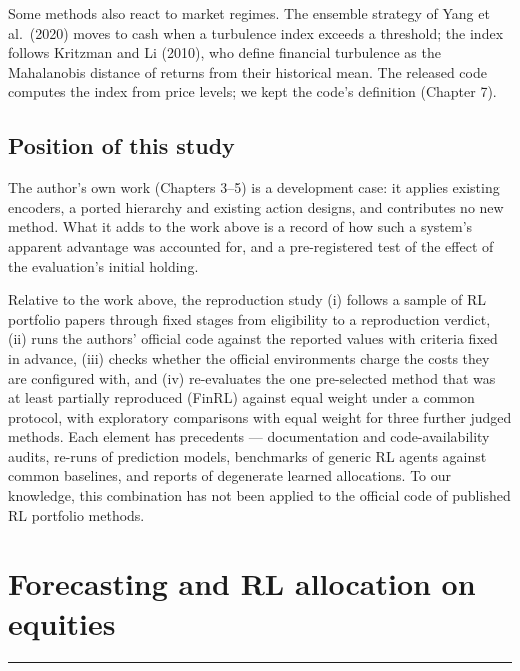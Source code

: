 \documentclass[12pt,a4paper]{report}
\begin{document}
Some methods also react to market regimes. The ensemble strategy of Yang
et al.~(2020) moves to cash when a turbulence index exceeds a threshold;
the index follows Kritzman and Li (2010), who define financial
turbulence as the Mahalanobis distance of returns from their historical
mean. The released code computes the index from price levels; we kept
the code's definition (Chapter 7).

\section{Position of this study}\label{position-of-this-study}

The author's own work (Chapters 3--5) is a development case: it applies
existing encoders, a ported hierarchy and existing action designs, and
contributes no new method. What it adds to the work above is a record of
how such a system's apparent advantage was accounted for, and a
pre-registered test of the effect of the evaluation's initial holding.

Relative to the work above, the reproduction study (i) follows a sample
of RL portfolio papers through fixed stages from eligibility to a
reproduction verdict, (ii) runs the authors' official code against the
reported values with criteria fixed in advance, (iii) checks whether the
official environments charge the costs they are configured with, and
(iv) re-evaluates the one pre-selected method that was at least
partially reproduced (FinRL) against equal weight under a common
protocol, with exploratory comparisons with equal weight for three
further judged methods. Each element has precedents --- documentation
and code-availability audits, re-runs of prediction models, benchmarks
of generic RL agents against common baselines, and reports of degenerate
learned allocations. To our knowledge, this combination has not been
applied to the official code of published RL portfolio methods.

\chapter{Forecasting and RL allocation on
equities}\label{chapter-3.-forecasting-and-rl-allocation-on-equities}

\begin{center}\rule{0.5\linewidth}{0.5pt}\end{center}
\end{document}
